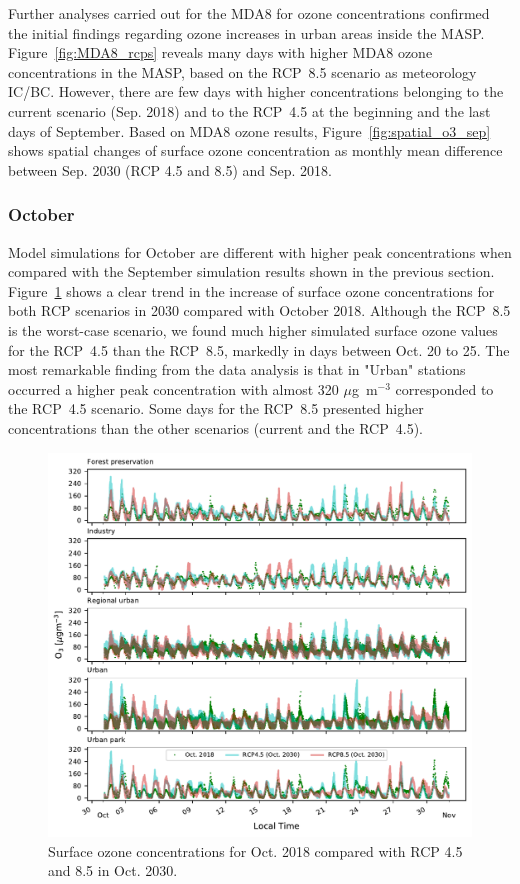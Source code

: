 Further analyses carried out for the MDA8 for ozone concentrations confirmed the initial findings regarding ozone increases in urban areas inside the MASP.
Figure~\ref{fig:MDA8_rcps} reveals many days with higher MDA8 ozone concentrations in the MASP, based on the RCP~8.5 scenario as meteorology IC/BC.
However, there are few days with higher concentrations belonging to the current scenario (Sep. 2018) and to the RCP~4.5 at the beginning and the last days of September.
Based on MDA8 ozone results, Figure~\ref{fig:spatial_o3_sep} shows spatial changes of surface ozone concentration as monthly mean difference between Sep. 2030 (RCP 4.5 and 8.5) and Sep. 2018.

\subsubsection{October}
Model simulations for October are different with higher peak concentrations when compared with the September simulation results shown in the previous section.
Figure~\ref{fig:o3_rcp_oct} shows a clear trend in the increase of surface ozone concentrations for both RCP scenarios in 2030 compared with October 2018.
Although the RCP~8.5 is the worst-case scenario, we found much higher simulated surface ozone values for the RCP~4.5 than the RCP~8.5, markedly in days between Oct. 20 to 25.
The most remarkable finding from the data analysis is that in "Urban" stations occurred a higher peak concentration with almost 320 $\mu$g~m$^{-3}$ corresponded to the RCP~4.5 scenario.
Some days for the RCP~8.5 presented higher concentrations than the other scenarios (current and the RCP~4.5).

\begin{figure}[!hbt]
  \includegraphics[width=1\textwidth]{fig/rcp_2030_oct_subplot_o3}
  \caption{Surface ozone concentrations for Oct. 2018 compared with RCP 4.5 and 8.5 in Oct. 2030.}
  \label{fig:o3_rcp_oct}
\end{figure}

